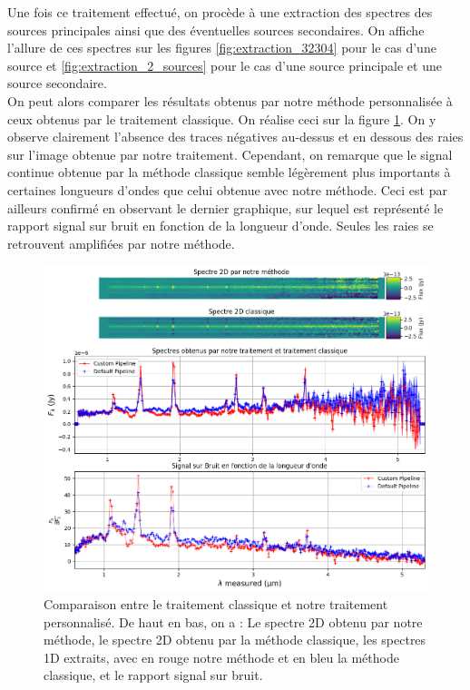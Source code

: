 \documentclass[11pt, a4paper]{article}
\begin{document}
Une fois ce traitement effectué, on procède à une extraction des spectres des sources principales ainsi que des éventuelles sources secondaires. On affiche l'allure de ces spectres sur les figures \ref{fig:extraction_32304} pour le cas d'une source et \ref{fig:extraction_2_sources} pour le cas d'une source principale et une source secondaire.\\

On peut alors comparer les résultats obtenus par notre méthode personnalisée à ceux obtenus par le traitement classique. On réalise ceci sur la figure \ref{fig:comparaison_mast_custom}. On y observe clairement l'absence des traces négatives au-dessus et en dessous des raies sur l'image obtenue par notre traitement. Cependant, on remarque que le signal continue obtenue par la méthode classique semble légèrement plus importants à certaines longueurs d'ondes que celui obtenue avec notre méthode. Ceci est par ailleurs confirmé en observant le dernier graphique, sur lequel est représenté le rapport signal sur bruit en fonction de la longueur d'onde. Seules les raies se retrouvent amplifiées par notre méthode.\\


\begin{figure}[!h]
  \centering
  \includegraphics[scale=0.5]{assets/comparaison_spectres_mast_custom.png}
  \caption{Comparaison entre le traitement classique et notre traitement personnalisé. De haut en bas, on a : Le spectre 2D obtenu par notre méthode, le spectre 2D obtenu par la méthode classique, les spectres 1D extraits, avec en rouge notre méthode et en bleu la méthode classique, et le rapport signal sur bruit.}
  \label{fig:comparaison_mast_custom}
\end{figure}
\end{document}
